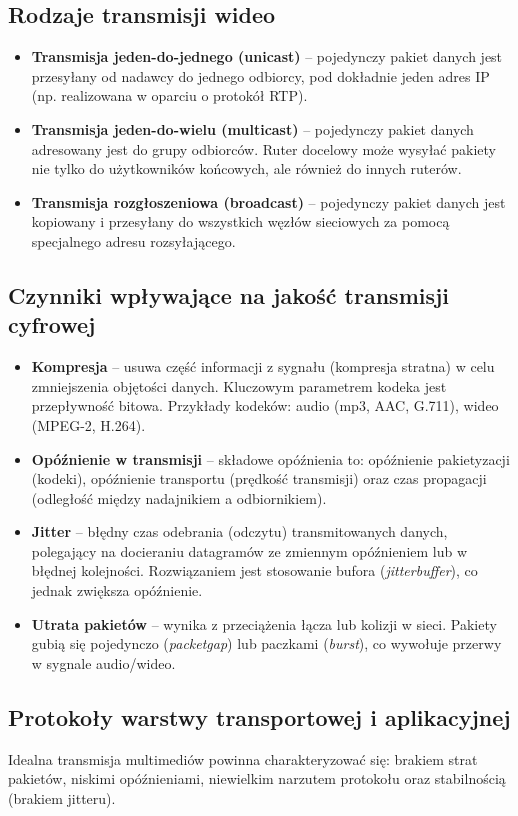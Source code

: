 \documentclass[11pt, a4paper]{article}
\begin{document}
\subsection{Rodzaje transmisji wideo}
\begin{itemize}
    \item \textbf{Transmisja jeden-do-jednego (unicast)} -- pojedynczy pakiet danych jest przesyłany od nadawcy do jednego odbiorcy, pod dokładnie jeden adres IP (np. realizowana w oparciu o protokół RTP).
    \item \textbf{Transmisja jeden-do-wielu (multicast)} -- pojedynczy pakiet danych adresowany jest do grupy odbiorców. Ruter docelowy może wysyłać pakiety nie tylko do użytkowników końcowych, ale również do innych ruterów.
    \item \textbf{Transmisja rozgłoszeniowa (broadcast)} -- pojedynczy pakiet danych jest kopiowany i przesyłany do wszystkich węzłów sieciowych za pomocą specjalnego adresu rozsyłającego.
\end{itemize}

\subsection{Czynniki wpływające na jakość transmisji cyfrowej}
\begin{itemize}
    \item \textbf{Kompresja} -- usuwa część informacji z sygnału (kompresja stratna) w celu zmniejszenia objętości danych. Kluczowym parametrem kodeka jest przepływność bitowa. Przykłady kodeków: audio (mp3, AAC, G.711), wideo (MPEG-2, H.264).
    \item \textbf{Opóźnienie w transmisji} -- składowe opóźnienia to: opóźnienie pakietyzacji (kodeki), opóźnienie transportu (prędkość transmisji) oraz czas propagacji (odległość między nadajnikiem a odbiornikiem).
    \item \textbf{Jitter} -- błędny czas odebrania (odczytu) transmitowanych danych, polegający na docieraniu datagramów ze zmiennym opóźnieniem lub w błędnej kolejności. Rozwiązaniem jest stosowanie bufora (\textit{jitterbuffer}), co jednak zwiększa opóźnienie.
    \item \textbf{Utrata pakietów} -- wynika z przeciążenia łącza lub kolizji w sieci. Pakiety gubią się pojedynczo (\textit{packetgap}) lub paczkami (\textit{burst}), co wywołuje przerwy w sygnale audio/wideo.
\end{itemize}

\subsection{Protokoły warstwy transportowej i aplikacyjnej}
Idealna transmisja multimediów powinna charakteryzować się: brakiem strat pakietów, niskimi opóźnieniami, niewielkim narzutem protokołu oraz stabilnością (brakiem jitteru).
\end{document}
